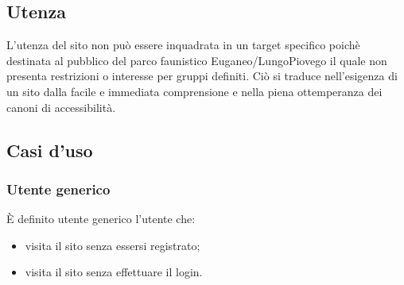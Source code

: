 \subsection{Utenza}
L'utenza del sito non può essere inquadrata in un target specifico poichè
destinata al pubblico del parco faunistico Euganeo/LungoPiovego il quale
non presenta restrizioni o interesse per gruppi definiti.
Ciò si traduce nell'esigenza di un sito dalla facile e immediata
comprensione e nella piena ottemperanza dei canoni di accessibilità.

\subsection{Casi d'uso}
    \subsubsection{Utente generico}
    È definito utente generico l’utente che:
    \begin{itemize}
        \item visita il sito senza essersi registrato;
        \item visita il sito senza effettuare il login.
    \end{itemize}